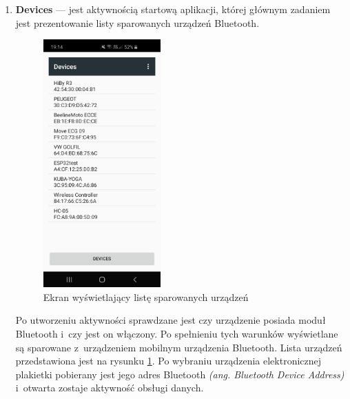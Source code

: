 \documentclass[a4paper,12pt, twoside]{article}
\begin{document}
    	\begin{enumerate}
    	   \item \textbf{Devices} — jest aktywnością startową aplikacji, której głównym zadaniem jest prezentowanie listy sparowanych urządzeń Bluetooth.
    	   \begin{figure}[H]
    	    \centering
    		    \includegraphics[width=4.5cm]{images/view_deviceList.jpg}
    			\caption{ Ekran wyświetlający listę sparowanych urządzeń}
                \label{fig:btdevices}
    	   \end{figure}
    	   Po utworzeniu aktywności sprawdzane jest czy urządzenie posiada moduł Bluetooth i~czy jest on włączony. Po spełnieniu tych warunków wyświetlane są sparowane z~urządzeniem mobilnym urządzenia Bluetooth. Lista urządzeń przedstawiona jest na rysunku \ref{fig:btdevices}. Po wybraniu urządzenia elektronicznej plakietki pobierany jest jego adres Bluetooth \textit{(ang. Bluetooth Device Address)} \cite{bdaddr} i~otwarta zostaje aktywność obsługi danych.
    	   

\end{enumerate}
\end{document}
